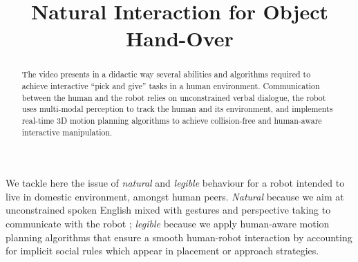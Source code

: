 \documentclass[conference]{IEEEtran}
\begin{document}
%
\title{Natural Interaction for Object Hand-Over}


\author{
}
\maketitle


\begin{abstract}

The video presents in a didactic way several abilities and algorithms
required to achieve interactive ``pick and give'' tasks in a human environment.
Communication between the human and the robot relies on unconstrained verbal
dialogue, the robot uses multi-modal perception to track the human and its
environment, and implements real-time 3D motion planning algorithms to achieve
collision-free and human-aware interactive manipulation.

\end{abstract}


We tackle here the issue of \emph{natural} and \emph{legible} behaviour for a
robot intended to live in domestic environment, amongst human peers.
\emph{Natural} because we aim at unconstrained spoken English mixed with
gestures and perspective taking to communicate with the robot ; \emph{legible}
because we apply human-aware motion planning algorithms that ensure a smooth
human-robot interaction by accounting for implicit social rules which appear in
placement or approach strategies.

\vspace{1em}

\end{document}
